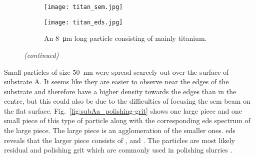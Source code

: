 \begin{figure}[htbp]
\ContinuedFloat
    \centering
    \begin{subfigure}[t]{\textwidth}
          \begin{minipage}[t]{0.49\linewidth}
            \centering
            \texttt{[image: titan\_sem.jpg]}
          \end{minipage}
          \hfill
          \begin{minipage}[t]{0.49\linewidth}
            \centering
            \texttt{[image: titan\_eds.jpg]}
          \end{minipage}
        \caption{An \SI{8}{\micro\metre} long particle consisting of mainly titanium.}\label{fig:subAa_titanium-particle}
    \end{subfigure}
    \captionsetup{list=no}
    \caption{\emph{(continued)}}
\end{figure}

Small particles of size \SI{50}{\nano\metre} were spread scarcely out over the surface of substrate A. It seems like they are easier to observe near the edges of the substrate and therefore have a higher density towards the edges than in the centre, but this could also be due to the difficulties of focusing the \ac{sem} beam on the flat surface. Fig.~\ref{fig:subAa_polishing-grit} shows one large piece and one small piece of this type of particle along with the corresponding \ac{eds} spectrum of the large piece. The large piece is an agglomeration of the smaller ones. \ac{eds} reveals that the larger piece consists of ,  and . The particles are most likely residual  and  polishing grit which are commonly used in polishing slurries \citep{benson2015as-received}.

\begin{comment}
\begin{figure}[htbp]
    \centering
    \subfigure[SEM image at a magnification of 150000$\times$.]{\texttt{[image: substrateA\_a2\_m006.jpg]}\label{fig:substrateA_a2_m006}}
    \subfigure[EDS.]{\texttt{[image: subA\_eds\_alumina02.jpg]}\label{fig:subA_eds_alumina02}}
    \caption[ SEM image and EDS spectrum of a particle on substrate A.]{High resolution scanning electron microscopy (SEM) image of one large and small piece of particles on substrate A and the corresponding \acf{eds} spectrum of the large piece.}
    \label{fig:subA_alumina}
\end{figure}
\end{comment}

